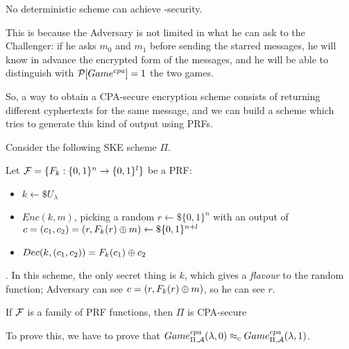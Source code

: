 \begin{observation}
    No deterministic scheme can achieve \cpa-security.
\end{observation}

This is because the Adversary is not limited in what he can ask to the Challenger: if he asks $m_{0}$ and $m_{1}$ before sending the starred messages, he will know in advance the encrypted form of the messages, and he will be able to distinguish with $ \P [Game^{cpa}]=1 $ the two games.

So, a way to obtain a CPA-secure encryption scheme consists of returning different cyphertexts for the same message, and we can build a scheme which tries to generate this kind of output using PRFs.

Consider the following SKE scheme $\Pi$.

Let $\F=\{ F_{k}:\{0,1\}^{n} \to \{0,1\}^{l} \}$ be a
PRF:
\begin{itemize}
    \item $k \leftarrow\$ U_{\lambda}$
    \item $Enc(k, m)$, picking a random $r \leftarrow\$ \{0,1\}^{n} $ with an
        output of $c=(c_{1}, c_{2})=(r, F_{k}(r) \xor m) \leftarrow\$
        \{0,1\}^{n+l}$
    
    \item $Dec(k, (c_{1}, c_{2}))=F_{k}(c_{1}) \xor c_{2}$
\end{itemize}
.
In this scheme, the only secret thing is $k$, which gives a \textit{flavour} to
the random function; Adversary can see $c=(r, F_{k}(r) \xor m)$, so he can see
$r$.
\begin{theorem}
    If $\F$ is a family of PRF functions, then $\Pi$ is  CPA-secure
\end{theorem}
To prove this, we have to prove that $Game_{\Pi, \A}^{cpa}(\lambda, 0)
\approx_{c} Game_{\Pi, \A}^{cpa}(\lambda, 1)$.
